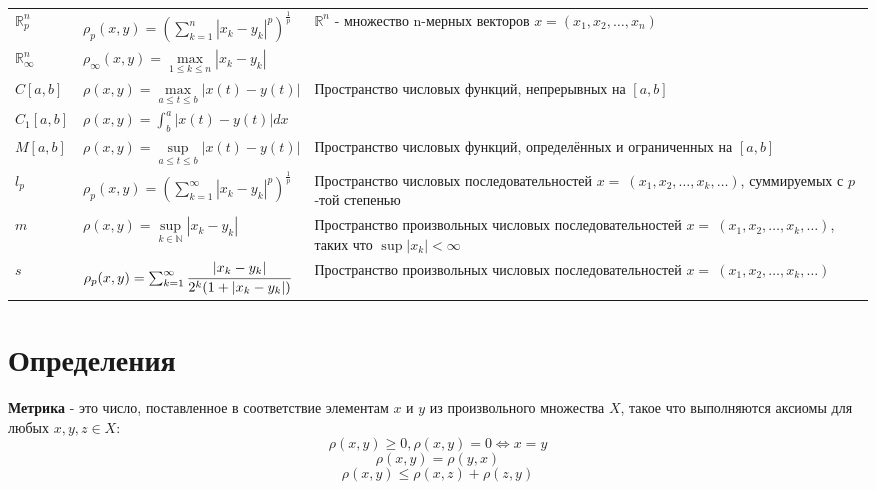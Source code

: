 {\begin{tabularx}{\textwidth}{||l|l|X||}
      $\mathbb{R}^n_p$      & $\rho_p (x, y)=(\sum_{k = 1}^{n}|x_k-y_k|^p)^\frac{1}{p}$            & \multirow{2}{6cm}{$\mathbb{R}^n$ - множество n-мерных векторов $x=(x_1, x_2, \dots, x_n)$  }                         \\
      \cline{1-2}
      $\mathbb{R}^n_\infty$ & $\rho_\infty (x, y)=\underset{1\leq k\leq n}{\max}|x_k-y_k|$              &                                                                                                                    \\
      \hline
      $C[a, b]$              & $\rho (x, y)=\underset{a \leq t \leq b}{\max}|x(t)-y(t)|$                 & \multirow{2}{6cm}{Пространство числовых функций, непрерывных на $[a, b]$}                                           \\
      \cline{1-2}
      $C_1[a, b]$            & $\rho (x, y)=\int_{b}^{a}|x(t)-y(t)|dx $                                &                                                                                                                    \\[5pt]
      \hline
      $M[a, b]$              & $\rho (x, y)=\underset{a \leq t \leq b}{\sup}|x(t)-y(t)|$                 & Пространство числовых функций, определённых и ограниченных на $[a, b]$                                              \\
      \hline
      $l_p$                 & $\rho_p (x, y)=(\sum_{k = 1}^{\infty}|x_k-y_k|^p)^\frac{1}{p}$            & Пространство числовых последовательностей $x=~(x_1, x_2, \dots, x_k, \dots)$, суммируемых с $p$-той степенью            \\
      \hline
      $m$                   & $\rho (x, y)=\underset{k \in \mathbb{N} }{\sup}|x_k-y_k|$                 & Пространство произвольных числовых последовательностей $x=~(x_1, x_2, \dots, x_k, \dots)$, таких что $\sup|x_k|<\infty$ \\
      \hline
      $s$                   & $\rho_p (x, y)=\sum_{k = 1}^{\infty} \cfrac{|x_k-y_k|}{2^k(1+|x_k-y_k|)}$ & Пространство произвольных числовых последовательностей $x=~(x_1, x_2, \dots, x_k, \dots)$                               \\
      \hline
  \end{tabularx}}


\section{Определения}

\textbf{Метрика} - это число, поставленное в соответствие элементам $x$ и $y$ из произвольного множества $X$, такое что выполняются аксиомы для любых $x, y, z\in X$:
\[\rho(x, y)\geq 0, \rho(x, y)=0\Longleftrightarrow x=y\]
\[\rho(x, y)=\rho(y, x)\]
\[\rho(x, y)\leqslant \rho(x, z)+\rho(z, y)\]

